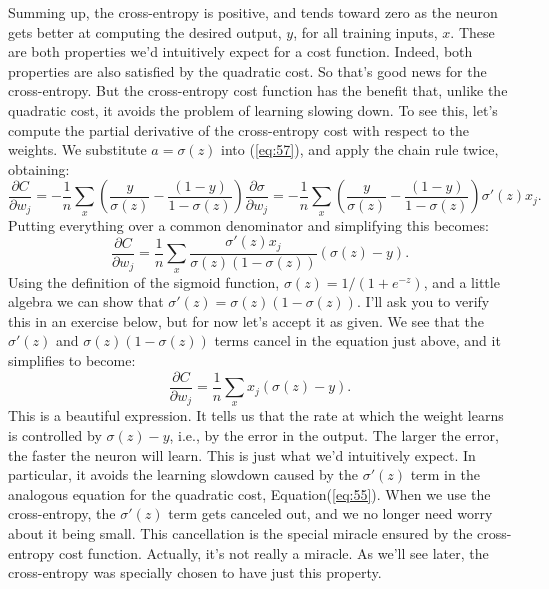 \documentclass[a4paper,twoside,10pt]{book}
\begin{document}
Summing up, the cross-entropy is positive, and tends toward zero as the neuron gets better at computing the desired output, $y$, for all training inputs, $x$. These are both properties we'd intuitively expect for a cost function. Indeed, both properties are also satisfied by the quadratic cost. So that's good news for the cross-entropy. But the cross-entropy cost function has the benefit that, unlike the quadratic cost, it avoids the problem of learning slowing down. To see this, let's compute the partial derivative of the cross-entropy cost with respect to the weights. We substitute $a=\sigma(z)$ into (\ref{eq:57}), and apply the chain rule twice, obtaining:
\begin{equation}
	\frac{\partial C}{\partial w_j}  =  -\frac{1}{n} \sum_x \left(
	\frac{y }{\sigma(z)} -\frac{(1-y)}{1-\sigma(z)} \right)
	\frac{\partial \sigma}{\partial w_j} = 
 -\frac{1}{n} \sum_x \left( 
	\frac{y}{\sigma(z)} 
	-\frac{(1-y)}{1-\sigma(z)} \right)\sigma'(z) x_j.
	\label{eq:59}
\end{equation}Putting everything over a common denominator and simplifying this becomes:
\begin{equation}
	\frac{\partial C}{\partial w_j}  =  \frac{1}{n}
	\sum_x \frac{\sigma'(z) x_j}{\sigma(z) (1-\sigma(z))}
	(\sigma(z)-y).
	\label{eq:60}
\end{equation}
Using the definition of the sigmoid function, $\sigma(z)=1/(1+e^{-z})$, and a little algebra we can show that $\sigma'(z)=\sigma(z)(1-\sigma(z))$. I'll ask you to verify this in an exercise below, but for now let's accept it as given. We see that the $\sigma'(z)$ and $\sigma(z)(1-\sigma(z))$ terms cancel in the equation just above, and it simplifies to become:
\begin{equation}
	\frac{\partial C}{\partial w_j} =  \frac{1}{n} \sum_x x_j(\sigma(z)-y).
	\label{eq:61}
\end{equation}
This is a beautiful expression. It tells us that the rate at which the weight learns is controlled by $\sigma(z)-y$, i.e., by the error in the output. The larger the error, the faster the neuron will learn. This is just what we'd intuitively expect. In particular, it avoids the learning slowdown caused by the $\sigma'(z)$ term in the analogous equation for the quadratic cost, Equation(\ref{eq:55}). When we use the cross-entropy, the $\sigma'(z)$ term gets canceled out, and we no longer need worry about it being small. This cancellation is the special miracle ensured by the cross-entropy cost function. Actually, it's not really a miracle. As we'll see later, the cross-entropy was specially chosen to have just this property.
\end{document}
